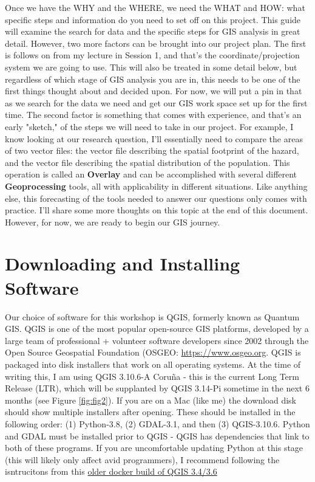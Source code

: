 \documentclass{article}
\begin{document}
Once we have the WHY and the WHERE, we need the WHAT and HOW: what specific steps and information do you need to set off on this project. This guide will examine the search for data and the specific steps for GIS analysis in great detail. However, two more factors can be brought into our project plan. The first is follows on from my lecture in Session 1, and that's the coordinate/projection system we are going to use. This will also be treated in some detail below, but regardless of which stage of GIS analysis you are in, this needs to be one of the first things thought about and decided upon. For now, we will put a pin in that as we search for the data we need and get our GIS work space set up for the first time. The second factor is something that comes with experience, and that's an early "sketch," of the steps we will need to take in our project. For example, I know looking at our research question, I'll essentially need to compare the areas of two vector files: the vector file describing the spatial footprint of the hazard, and the vector file describing the spatial distribution of the population. This operation is called an \textbf{Overlay} and can be accomplished with several different \textbf{Geoprocessing} tools, all with applicability in different situations. Like anything else, this forecasting of the tools needed to answer our questions only comes with practice. I'll share some more thoughts on this topic at the end of this document. However, for now, we are ready to begin our GIS journey. 

\section{Downloading and Installing Software}

Our choice of software for this workshop is QGIS, formerly known as Quantum GIS. QGIS is one of the most popular open-source GIS platforms, developed by a large team of professional + volunteer software developers since 2002 through the Open Source Geospatial Foundation (OSGEO: \href{https://www.osgeo.org}{https://www.osgeo.org}. QGIS is packaged into disk installers that work on all operating systems. At the time of writing this, I am using QGIS 3.10.6-A Coru\~na - this is the current Long Term Release (LTR), which will be supplanted by QGIS 3.14-Pi sometime in the next 6 months (see Figure \ref{fig:fig2}). If you are on a Mac (like me) the download disk should show multiple installers after opening. These should be installed in the following order: (1) Python-3.8, (2) GDAL-3.1, and then (3) QGIS-3.10.6. Python and GDAL must be installed prior to QGIS - QGIS has dependencies that link to both of these programs. If you are uncomfortable updating Python at this stage (this will likely only affect avid programmers), I recommend following the isntrucitons from this \href{https://github.com/rafdouglas/qgis_desktop_docker}{older docker build of QGIS 3.4/3.6}
\end{document}

